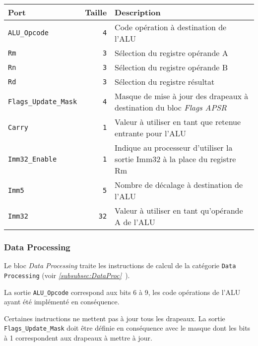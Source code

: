\begin{tabular}{|l|r|l|}
\hline 
\textbf{Port} & \textbf{Taille} & \textbf{Description}\\
\hline

\texttt{ALU\_Opcode}		&  \texttt{4} & Code opération à destination de l'ALU\\
\hline
\texttt{Rm}			&  \texttt{3} & Sélection du registre opérande A\\
\hline
\texttt{Rn}			&  \texttt{3} & Sélection du registre opérande B\\
\hline
\texttt{Rd}			&  \texttt{3} & Sélection du registre résultat\\
\hline
\texttt{Flags\_Update\_Mask}	&  \texttt{4} & Masque de mise à jour des drapeaux à destination du bloc \textit{Flags APSR}\\
\hline
\texttt{Carry}			&  \texttt{1} & Valeur à utiliser en tant que retenue entrante pour l'ALU\\
\hline
\texttt{Imm32\_Enable}		&  \texttt{1} & Indique au processeur d'utiliser la sortie Imm32 à la place du registre Rm\\
\hline
\texttt{Imm5}			&  \texttt{5} & Nombre de décalage à destination de l'ALU\\
\hline
\texttt{Imm32}			& \texttt{32} & Valeur à utiliser en tant qu'opérande A de l'ALU\\

\hline
\end{tabular}








\subsubsection{Data Processing}


Le bloc \textit{Data Processing} traite les instructions de calcul de la catégorie \texttt{Data Processing} (voir \textit{\ref{subsubsec:DataProc}~}).

La sortie \texttt{ALU\_Opcode} correspond aux bits 6 à 9, les code opérations de l'ALU ayant été implémenté en conséquence.

Certaines instructions ne mettent pas à jour tous les drapeaux. La sortie \texttt{Flags\_Update\_Mask} doit être définie en conséquence avec le masque dont les bits à 1 correspondent aux drapeaux à mettre à jour.


